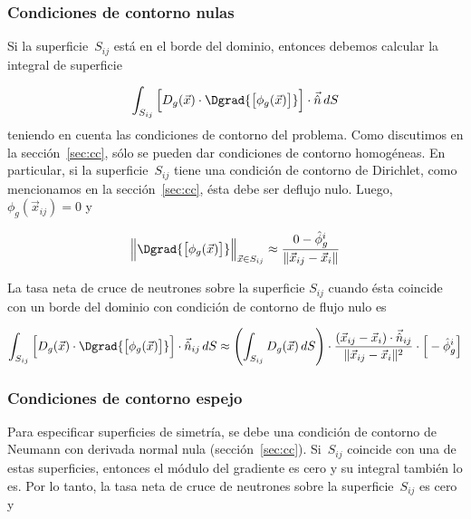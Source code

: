 \subsubsection{Condiciones de contorno nulas} %

Si la superficie~$S_{ij}$ está en el borde del dominio, entonces debemos calcular la integral de superficie

\begin{equation*}
\int_{S_{ij}} \Big[ D_g(\vec{x}) \cdot \Dgrad {\big[\phi_g(\vec{x})\big]} \Big] \cdot \vec{\hat{n}} \, dS
\end{equation*}
%
teniendo en cuenta las condiciones de contorno del problema. Como discutimos en la sección~\ref{sec:cc}, sólo se pueden dar condiciones de contorno homogéneas. En particular, si la superficie~$S_{ij}$ tiene una condición de contorno de Dirichlet, como mencionamos en la sección~\ref{sec:cc}, ésta debe ser deflujo nulo. Luego,~$\phi_g(\vec{x}_{ij}) = 0$ y

\begin{equation*}
\Big\| \Dgrad {\big[ \phi_g(\vec{x}) \big]} \Big\|_{\vec{x} \in S_{ij}} \approx \frac{0 - \hat{\phi}_g^i}{ \| \vec{x}_{ij} - \vec{x}_i \|}
\end{equation*}

La tasa neta de cruce de neutrones sobre la superficie $S_{ij}$ cuando ésta coincide con un borde del dominio con condición de contorno de flujo nulo es

\begin{equation}\label{eq:vol-tasa-cruce-flujo-nulo}
\int_{S_{ij}} \Big[ D_g(\vec{x}) \cdot \Dgrad {\big[\phi_g(\vec{x})\big]} \Big] \cdot \vec{\hat{n}}_{ij} \, dS \approx
\left( \int_{S_{ij}} D_g(\vec{x}) \, dS \right) \cdot \frac{(\vec{x}_{ij} - \vec{x}_i) \cdot \vec{\hat{n}}_{ij}}{\| \vec{x}_{ij} - \vec{x}_i \|^2}  \cdot \Big[ - \hat{\phi}_g^i\Big]
\end{equation}


\subsubsection{Condiciones de contorno espejo} %

Para especificar superficies de simetría, se debe una condición de contorno de Neumann con derivada normal nula (sección~\ref{sec:cc}). Si~$S_{ij}$ coincide con una de estas superficies, entonces el módulo del gradiente es cero y su integral también lo es. Por lo tanto, la tasa neta de cruce de neutrones sobre la superficie~$S_{ij}$ es cero y

